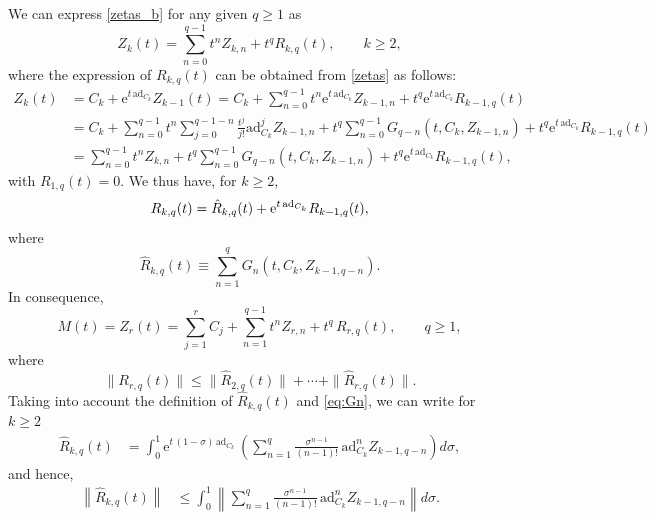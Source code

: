 \documentclass[11pt]{article}
\newcommand{\e}{\ensuremath{\mathrm{e}}}
\newcommand{\ad}{\ensuremath{\mathrm{ad}}}
\begin{document}
We can express \eqref{zetas_b} for any given $q \ge 1$ as
\begin{equation}
\label{eq:Zk_with_remainder}
Z_k(t) = \sum_{n=0}^{q-1} t^{n} Z_{k,n} + t^q R_{k,q}(t), \qquad k\geq 2,
\end{equation}
where the expression of $R_{k,q}(t)$ can be obtained from \eqref{zetas} as follows:
\[
\begin{aligned}
Z_k(t) &= C_k + \e^{t \, \ad_{C_k}}  Z_{k-1}(t) = C_k + \sum_{n=0}^{q-1} t^{n} \e^{t \, \ad_{C_k}}  Z_{k-1,n} + t^q \e^{t \, \ad_{C_k}} R_{k-1,q}(t) \\
&=  C_k + \sum_{n=0}^{q-1} t^n \sum_{j=0}^{q-1-n} \frac{t^{j}}{j!} \ad_{C_k}^{j} Z_{k-1,n} + t^q \sum_{n=0}^{q-1}  G_{q-n}\left(t, C_k, Z_{k-1,n}\right) +
 t^q \e^{t \, \ad_{C_k}} R_{k-1,q}(t) \\
 & = \sum_{n=0}^{q-1} t^{n} Z_{k,n} + t^q \sum_{n=0}^{q-1}  G_{q-n}\left(t, C_k, Z_{k-1,n}\right) +
 t^q \e^{t \, \ad_{C_k}} R_{k-1,q}(t),\
 \end{aligned}
 \]
with $R_{1,q}(t)=0$. We thus have, for $k\geq 2$,
\begin{equation}
\label{eq:R_{k,q}}
R_{k,q}(t) = \hat R_{k,q}(t) + \e^{t \, \ad_{C_k}} R_{k-1,q}(t),
\end{equation}
where 
\begin{equation*}
\hat R_{k,q}(t) \equiv  \sum_{n=1}^{q}  G_{n}\left(t, C_k, Z_{k-1,q-n}\right).
\end{equation*}
In consequence,
\begin{equation}  \label{eq_M(t)}
M(t) = Z_r(t) = \sum_{j=1}^{r} C_j + \sum_{n=1}^{q-1} t^n Z_{r,n} + t^q \, R_{r,q}(t), \qquad q \ge 1,
\end{equation}
where 
\begin{equation*}
\| R_{r,q}(t) \| \leq \| \hat R_{2,q}(t) \| +  \cdots + \| \hat R_{r,q}(t) \|.
\end{equation*}
Taking into account the definition of $\hat R_{k,q}(t)$ and  \eqref{eq:Gn}, we can write
for $k\geq 2$
\begin{align*}
\hat R_{k,q}(t)
&= 
\int_0^1  \e^{t \, (1-\sigma)\, \ad_{C_k}}\, 
\left(  \sum_{n=1}^{q} \frac{\sigma^{n-1}}{(n-1)!} \, \ad_{C_k}^n Z_{k-1,q-n} 
\right)
d\sigma,
\end{align*}
and hence,
\begin{align*}
\left\| \hat R_{k,q}(t) \right\| &\leq
\int_0^1
\left\|
 \sum_{n=1}^{q} \frac{\sigma^{n-1}}{(n-1)!} \, \ad_{C_k}^n Z_{k-1,q-n} 
\right\|
d\sigma.
\end{align*}
\end{document}
